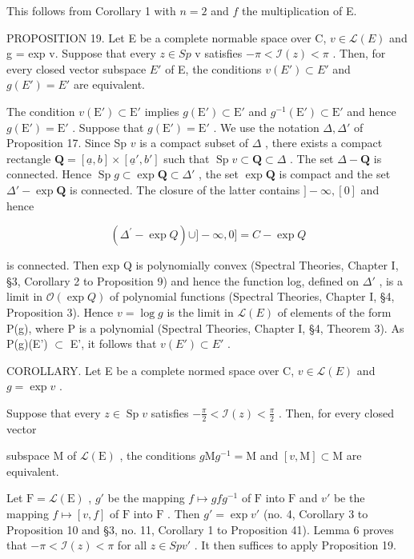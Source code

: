 This follows from Corollary 1 with \(n = 2\) and \(f\) the multiplication of E.

PROPOSITION 19. Let E be a complete normable space over C, \(v \in \mathcal{L}(E)\) and g = exp v. Suppose that every \(z \in Sp\) v satisfies \(-\pi < \mathcal{I}(z) < \pi\) . Then, for every closed vector subspace \(E'\) of E, the conditions \(v(E') \subset E'\) and \(g(E') = E'\) are equivalent.

The condition \(v(\mathrm{E}') \subset \mathrm{E}'\) implies \(g(\mathrm{E}') \subset \mathrm{E}'\) and \(g^{-1}(\mathrm{E}') \subset \mathrm{E}'\) and hence \(g(\mathrm{E}') = \mathrm{E}'\) . Suppose that \(g(\mathrm{E}') = \mathrm{E}'\) . We use the notation \(\Delta, \Delta'\) of Proposition 17. Since Sp \(v\) is a compact subset of \(\Delta\) , there exists a compact rectangle \(\mathbf{Q} = [\underline{a}, b] \times [\underline{a}', b']\) such that \(\operatorname{Sp} v \subset \mathbf{Q} \subset \Delta\) . The set \(\Delta - \mathbf{Q}\) is connected. Hence \(\operatorname{Sp} g \subset \exp \mathbf{Q} \subset \Delta'\) , the set \(\exp \mathbf{Q}\) is compact and the set \(\Delta' - \exp \mathbf{Q}\) is connected. The closure of the latter contains \(] - \infty, [0]\) and hence

\[
\left. \left(\Delta^ {\prime} - \exp Q\right) \cup ] - \infty , 0 ] = C - \exp Q \right.
\]

is connected. Then exp Q is polynomially convex (Spectral Theories, Chapter I, §3, Corollary 2 to Proposition 9) and hence the function log, defined on \(\Delta'\) , is a limit in \(\mathcal{O}(\exp Q)\) of polynomial functions (Spectral Theories, Chapter I, §4, Proposition 3). Hence \(v = \log g\) is the limit in \(\mathcal{L}(E)\) of elements of the form P(g), where P is a polynomial (Spectral Theories, Chapter I, §4, Theorem 3). As P(g)(E') \(\subset\) E', it follows that \(v(E') \subset E'\) .

COROLLARY. Let E be a complete normed space over C, \(v \in \mathcal{L}(E)\) and \(g = \exp v\) .

Suppose that every \(z \in \operatorname{Sp} v\) satisfies \(-\frac{\pi}{2} < \mathcal{I}(z) < \frac{\pi}{2}\) . Then, for every closed vector

subspace M of \(\mathcal{L}(\mathrm{E})\) , the conditions \(g\mathrm{M}g^{-1} = \mathrm{M}\) and \([v, \mathrm{M}] \subset \mathrm{M}\) are equivalent.

Let \(\mathrm{F} = \mathcal{L}(\mathrm{E})\) , \(g'\) be the mapping \(f \mapsto gfg^{-1}\) of \(\mathrm{F}\) into \(\mathrm{F}\) and \(v'\) be the mapping \(f \mapsto [v, f]\) of \(\mathrm{F}\) into \(\mathrm{F}\) . Then \(g' = \exp v'\) (no. 4, Corollary 3 to Proposition 10 and §3, no. 11, Corollary 1 to Proposition 41). Lemma 6 proves that \(-\pi < \mathcal{I}(z) < \pi\) for all \(z \in Sp v'\) . It then suffices to apply Proposition 19.

